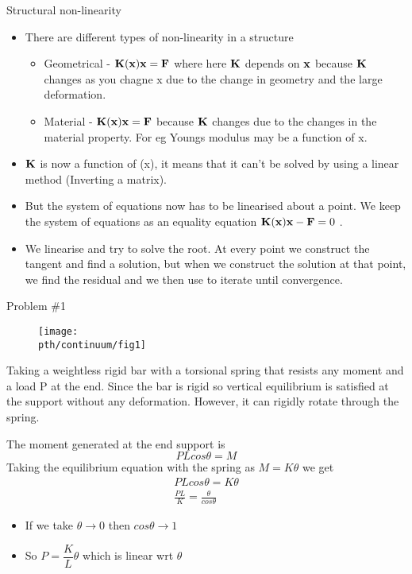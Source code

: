 	\begin{frame}{Structural non-linearity }
		\begin{itemize}
		\item There are different types of non-linearity in a structure 
		\begin{itemize}
			\item Geometrical - $\mathbf{K(x)x = F }$ where here $\mathbf{K}$ depends on $\mathbf{x}$ because $\mathbf{K}$ changes as you chagne x due to the change in geometry and the large deformation.  
			\item Material - $\mathbf{K(x)x = F }$ because $\mathbf{K}$ changes due to the changes in the material property. For eg Youngs modulus may be a function of x. 
		\end{itemize}
		\item $\mathbf{K}$ is now a function of (x), it means that it can't be solved by using a linear method (Inverting a matrix). 
		\item But the system of equations now has to be linearised about a point. 
		We keep the system of equations as an equality equation $\mathbf{K(x)x - F} = 0$ . 
		\item We linearise and try to solve the root. At every point we construct the tangent and find a solution, but when we construct the solution at that point, we find the residual and we then use to iterate until convergence. 	
		\end{itemize}
	\end{frame}
		
	\begin{frame}{Problem \#1}
		\begin{figure}
			\centering
			\texttt{[image: \\pth/continuum/fig1]}
			\caption{}
			\label{fig:fig1}
		\end{figure}
		Taking a weightless rigid bar with a torsional spring that resists any moment and a load P at the end. Since the bar is rigid so vertical equilibrium is satisfied at the support without any deformation. However, it can rigidly rotate through the spring.
	\end{frame}
	
	\begin{frame}
		 The moment generated at the end support is	 
		\begin{equation}
			PL cos \theta = M
		\end{equation}
		Taking the equilibrium equation with the spring as $ M = K \theta$ we get
		\begin{align*}
		PL cos \theta = K \theta \\
		\frac{PL}{K} = \frac{\theta}{cos \theta}
		\end{align*}
		\begin{itemize}
			\item If we take $\theta \rightarrow 0$ then $cos \theta \rightarrow 1$
			\item So $P = \dfrac{K}{L}\theta$ which is linear wrt $\theta$
		\end{itemize}
	\end{frame}

